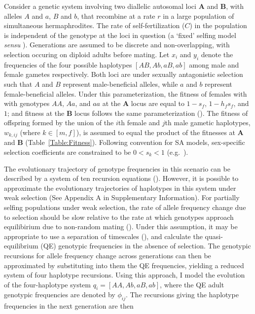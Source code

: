 \documentclass{article}
\begin{document}
Consider a genetic system involving two diallelic autosomal loci $\mathbf{A}$ and $\mathbf{B}$, with alleles $A$ and $a$, $B$ and $b$, that recombine at a rate $r$ in a large population of simultaneous hermaphrodites. The rate of self-fertilization ($C$) in the population is independent of the genotype at the loci in question (a `fixed' selfing model \textit{sensu} \citealt{Holden1979,CaballeroHill1992, JordanConn2014}). Generations are assumed to be discrete and non-overlapping, with selection occuring on diploid adults before mating. Let $x_i$ and $y_i$ denote the frequencies of the four possible haplotypes $[AB, Ab, aB, ab]$ among male and female gametes respectively. Both loci are under sexually antagonistic selection such that $A$ and $B$ represent male-beneficial alleles, while $a$ and $b$ represent female-beneficial alleles. Under this parameterization, the fitness of females with with genotypes $AA$, $Aa$, and $aa$ at the $\mathbf{A}$ locus are equal to $1 - s_f$, $1 - h_f s_f$, and $1$; and fitness at the $\mathbf{B}$ locus follows the same parameterization (\citealt{Kidwell1977}). The fitness of offspring formed by the union of the $i$th female and $j$th male gametic haplotypes, $w_{k,ij}$ (where $k \in [m,f]$), is assumed to equal the product of the fitnesses at $\mathbf{A}$ and $\mathbf{B}$ (Table~\ref{Table:Fitness}). Following convention for SA models, sex-specific selection coefficients are constrained to be $0 < s_k < 1$ (e.g.~\citealt{Kidwell1977}).

The evolutionary trajectory of genotype frequencies in this scenario can be described by a system of ten recursion equations (\citealt{Holden1979, JordanConn2014}). However, it is possible to approximate the evolutionary trajectories of haplotypes in this system under weak selection (See Appendix A in Supplementary Information). For partially selfing populations under weak selection, the rate of allele frequency change due to selection should be slow relative to the rate at which genotypes approach equilibirium due to non-random mating (\citealt{Nagylaki1997}). Under this assumption, it may be appropriate to use a separation of timescales (\citealt{OttoDay2007}), and calculate the quasi-equilibrium (QE) genotypic frequencies in the absence of selection. The genotypic recursions for allele frequency change across generations can then be approximated by substituting into them the QE frequencies, yielding a reduced system of four haplotype recursions. Using this approach, I model the evolution of the four-haplotype system $q_i = [AA, Ab, aB, ab]$, where the QE adult genotypic frequencies are denoted by $\phi_{ij}$. The recursions giving the haplotype frequencies in the next generation are then
\end{document}
